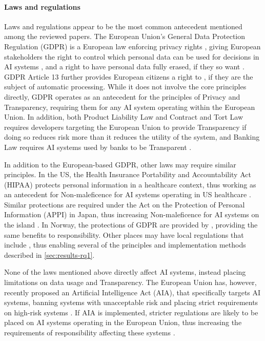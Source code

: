 \paragraph{Laws and regulations}
Laws and regulations appear to be the most common antecedent mentioned among the reviewed papers. The European Union's General Data Protection Regulation (GDPR) is a European law enforcing privacy rights \parencite{Chen_2020,Werder_2022,Nevanperä_2021}, giving European stakeholders the right to control which personal data can be used for decisions in AI systems \parencite{Hacker_2022}, and a right to have personal data fully erased, if they so want \parencite{Fjeld_2020}. GDPR Article 13 further provides European citizens a right to  \parencite[p.~41]{GDPR}, if they are the subject of automatic processing. While it does not involve the core principles directly, GDPR operates as an antecedent for the principles of Privacy and Transparency, requiring them for any AI system operating within the European Union. In addition, both Product Liability Law and Contract and Tort Law requires developers targeting the European Union to provide Transparency if doing so reduces risk more than it reduces the utility of the system, and Banking Law requires AI systems used by banks to be Transparent \parencite{Hacker_2022}.

In addition to the European-based GDPR, other laws may require similar principles. In the US, the Health Insurance Portability and Accountability Act (HIPAA) protects personal information in a healthcare context, thus working as an antecedent for Non-maleficence for AI systems operating in US healthcare \parencite{Werder_2022}. Similar protections are required under the Act on the Protection of Personal Information (APPI) in Japan, thus increasing Non-maleficence for AI systems on the island \parencite{WangY_2020}. In Norway, the protections of GDPR are provided by \textcite{personvernforordningen}, providing the same benefits to responsibility. Other places may have local regulations that include  \parencite[p.~60-61]{Papagiannidis_2022}, thus enabling several of the principles and implementation methods described in \autoref{sec:results-rq1}.

None of the laws mentioned above directly affect AI systems, instead placing limitations on data usage and Transparency. The European Union has, however, recently proposed an Artificial Intelligence Act (AIA), that specifically targets AI systems, banning systems with unacceptable risk and placing strict requirements on high-risk systems \parencite{AIA}. If AIA is implemented, stricter regulations are likely to be placed on AI systems operating in the European Union, thus increasing the requirements of responsibility affecting these systems \parencite{Hacker_2022}.

